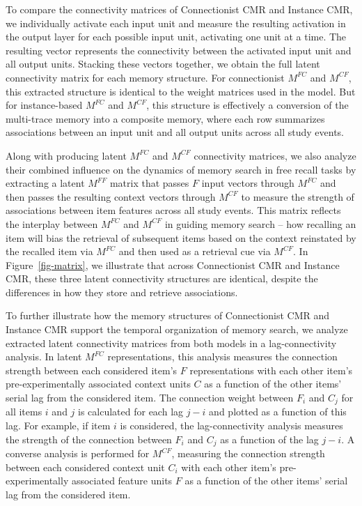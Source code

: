 \documentclass[
  letterpaper,
  11pt,
  english,
  singlespacing,
  headsepline]{MastersDoctoralThesis}
\begin{document}
To compare the connectivity matrices of Connectionist CMR and Instance
CMR, we individually activate each input unit and measure the resulting
activation in the output layer for each possible input unit, activating
one unit at a time. The resulting vector represents the connectivity
between the activated input unit and all output units. Stacking these
vectors together, we obtain the full latent connectivity matrix for each
memory structure. For connectionist \(M^{FC}\) and \(M^{CF}\), this
extracted structure is identical to the weight matrices used in the
model. But for instance-based \(M^{FC}\) and \(M^{CF}\), this structure
is effectively a conversion of the multi-trace memory into a composite
memory, where each row summarizes associations between an input unit and
all output units across all study events.

Along with producing latent \(M^{FC}\) and \(M^{CF}\) connectivity
matrices, we also analyze their combined influence on the dynamics of
memory search in free recall tasks by extracting a latent \(M^{FF}\)
matrix that passes \(F\) input vectors through \(M^{FC}\) and then
passes the resulting context vectors through \(M^{CF}\) to measure the
strength of associations between item features across all study events.
This matrix reflects the interplay between \(M^{FC}\) and \(M^{CF}\) in
guiding memory search -- how recalling an item will bias the retrieval
of subsequent items based on the context reinstated by the recalled item
via \(M^{FC}\) and then used as a retrieval cue via \(M^{CF}\). In
Figure~\ref{fig-matrix}, we illustrate that across Connectionist CMR and
Instance CMR, these three latent connectivity structures are identical,
despite the differences in how they store and retrieve associations.

To further illustrate how the memory structures of Connectionist CMR and
Instance CMR support the temporal organization of memory search, we
analyze extracted latent connectivity matrices from both models in a
lag-connectivity analysis. In latent \(M^{FC}\) representations, this
analysis measures the connection strength between each considered item's
\(F\) representations with each other item's pre-experimentally
associated context units \(C\) as a function of the other items' serial
lag from the considered item. The connection weight between \(F_i\) and
\(C_j\) for all items \(i\) and \(j\) is calculated for each lag \(j-i\)
and plotted as a function of this lag. For example, if item \(i\) is
considered, the lag-connectivity analysis measures the strength of the
connection between \(F_i\) and \(C_j\) as a function of the lag \(j-i\).
A converse analysis is performed for \(M^{CF}\), measuring the
connection strength between each considered context unit \(C_i\) with
each other item's pre-experimentally associated feature units \(F\) as a
function of the other items' serial lag from the considered item.
\end{document}

